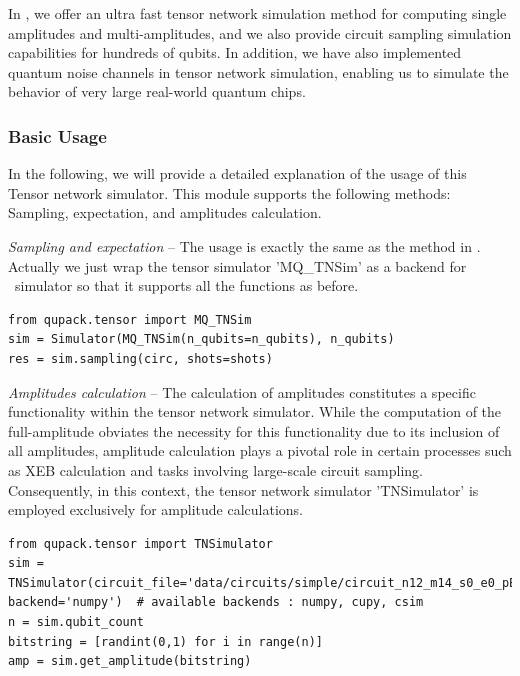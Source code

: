 In \QuPack, we offer an ultra fast tensor network simulation method for computing single amplitudes and multi-amplitudes\cite{kalachev2022multitensor}, and we also provide circuit sampling simulation capabilities for hundreds of qubits. In addition, we have also implemented quantum noise channels in tensor network simulation, enabling us to simulate the behavior of very large real-world quantum chips.

\subsubsection{Basic Usage}
In the following, we will provide a detailed explanation of the usage of this Tensor network simulator.
This module supports the following methods: Sampling,  expectation, and amplitudes calculation. 

\textit{Sampling and expectation} -- The usage is exactly the same as the method in \MindQuantum. Actually we just wrap the tensor simulator 'MQ\_TNSim' as a backend for \MindQuantum \  simulator so that it supports all the functions as before. 
\begin{lstlisting}
from qupack.tensor import MQ_TNSim
sim = Simulator(MQ_TNSim(n_qubits=n_qubits), n_qubits)
res = sim.sampling(circ, shots=shots)
\end{lstlisting}

\textit{Amplitudes calculation} -- The calculation of amplitudes constitutes a specific functionality within the tensor network simulator. While the computation of the full-amplitude obviates the necessity for this functionality due to its inclusion of all amplitudes, amplitude calculation plays a pivotal role in certain processes such as XEB calculation and tasks involving large-scale circuit sampling. Consequently, in this context, the tensor network simulator 'TNSimulator' is employed exclusively for amplitude calculations.

\begin{lstlisting}
from qupack.tensor import TNSimulator
sim = TNSimulator(circuit_file='data/circuits/simple/circuit_n12_m14_s0_e0_pEFGH.qsim', backend='numpy')  # available backends : numpy, cupy, csim
n = sim.qubit_count
bitstring = [randint(0,1) for i in range(n)]
amp = sim.get_amplitude(bitstring)
\end{lstlisting}

